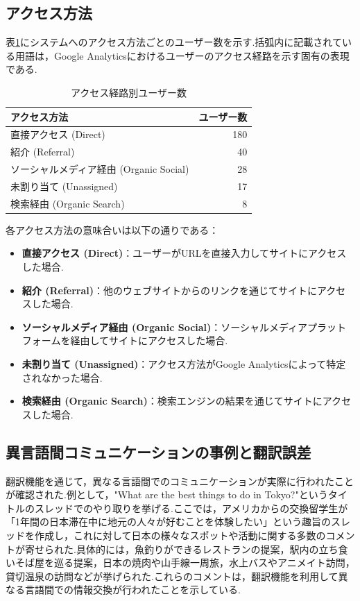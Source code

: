 \documentclass[b5paper,12pt,dvipdfmx]{jsreport}
\begin{document}
\subsection{アクセス方法}
表\ref{table:access-methods}にシステムへのアクセス方法ごとのユーザー数を示す.括弧内に記載されている用語は，Google Analyticsにおけるユーザーのアクセス経路を示す固有の表現である.

\begin{table}[H]
    \centering
    \caption{アクセス経路別ユーザー数}
    \label{table:access-methods}
    \begin{tabular}{|l|r|}
        \hline
        \textbf{アクセス方法} & \textbf{ユーザー数} \\
        \hline
        直接アクセス (Direct) & 180 \\
        紹介 (Referral) & 40 \\
        ソーシャルメディア経由 (Organic Social) & 28 \\
        未割り当て (Unassigned) & 17 \\
        検索経由 (Organic Search) & 8 \\
        \hline
    \end{tabular}
\end{table}

各アクセス方法の意味合いは以下の通りである：
\begin{itemize}
    \item \textbf{直接アクセス (Direct)}：ユーザーがURLを直接入力してサイトにアクセスした場合.
    \item \textbf{紹介 (Referral)}：他のウェブサイトからのリンクを通じてサイトにアクセスした場合.
    \item \textbf{ソーシャルメディア経由 (Organic Social)}：ソーシャルメディアプラットフォームを経由してサイトにアクセスした場合.
    \item \textbf{未割り当て (Unassigned)}：アクセス方法がGoogle Analyticsによって特定されなかった場合.
    \item \textbf{検索経由 (Organic Search)}：検索エンジンの結果を通じてサイトにアクセスした場合.
\end{itemize}


\subsection{異言語間コミュニケーションの事例と翻訳誤差}
翻訳機能を通じて，異なる言語間でのコミュニケーションが実際に行われたことが確認された.例として，"What are the best things to do in Tokyo?"というタイトルのスレッドでのやり取りを挙げる.ここでは，アメリカからの交換留学生が「1年間の日本滞在中に地元の人々が好むことを体験したい」という趣旨のスレッドを作成し，これに対して日本の様々なスポットや活動に関する多数のコメントが寄せられた.具体的には，魚釣りができるレストランの提案，駅内の立ち食いそば屋を巡る提案，日本の焼肉や山手線一周旅，水上バスやアニメイト訪問，貸切温泉の訪問などが挙げられた.これらのコメントは，翻訳機能を利用して異なる言語間での情報交換が行われたことを示している.
\end{document}
